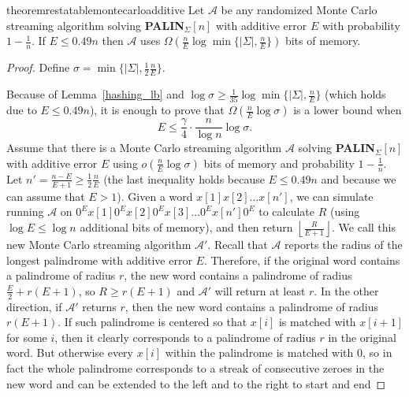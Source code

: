 \documentclass{article}[11pt,letter]
\newcommand{\alg}{\mathcal{A}}
\newcommand{\palin}[1][n]{{\bf PALIN}$_{\Sigma}[#1]$\xspace}
\newcommand{\aerr}{\ensuremath{E}}
\begin{document}
\begin{restatable}{theorem}{restatablemontecarloadditive}
\label{th:montecarlo_additive_lowerbound}
Let $\alg$ be any randomized Monte Carlo streaming algorithm solving \palin with additive error $\aerr$
with probability $1-\frac{1}{n}$. If $\aerr \le 0.49n$ then $\alg$ uses
$\Omega(\frac{n}{\aerr} \log \min \{|\Sigma|,\frac{n}{\aerr}\} )$ bits of memory.
\end{restatable}

\begin{proof}
Define $\sigma = \min \{|\Sigma|,\frac12 \frac{n}{\aerr}\}.$

Because of Lemma~\ref{hashing_lb} and $\log\sigma \geq \frac{1}{35}\log \min\{|\Sigma|,\frac{n}{\aerr}\}$
(which holds due to $\aerr \leq 0.49n$),
it is enough to prove that $\Omega(\frac{n}{\aerr} \log \sigma)$ is a lower bound when 
\begin{equation}\label{foo} \aerr \le \frac{\gamma}4 \cdot \frac{n}{\log n} \log \sigma. \end{equation} 
Assume that there is a Monte Carlo streaming algorithm $\alg$ solving \palin with additive error $\aerr$ using $o(\frac{n}{\aerr}\log \sigma)$ 
bits of memory and probability $1-\frac{1}{n}$. 
Let $n' = \frac{n-\aerr}{\aerr+1} \ge \frac12 \frac{n}{\aerr}$ (the last inequality holds because $\aerr \le 0.49n$ and because we can assume that $\aerr > 1$).  Given a word $x[1] x[2] \ldots x[n']$, we can simulate running $\alg$
on $0^{\aerr} x[1] 0^{\aerr} x[2] 0^{\aerr} x[3] \ldots 0^{\aerr} x[n'] 0^{\aerr}$ to calculate $R$ (using $\log \aerr \leq \log n$ additional bits of memory), and then return $\left\lfloor \frac{R}{\aerr+1}\right\rfloor$.
We call this new Monte Carlo streaming algorithm $\alg'$.
Recall that $\alg$ reports the radius of the longest palindrome with additive error $\aerr$. Therefore, if the original word contains
a palindrome of radius $r$, the new word contains a palindrome of radius $\frac{\aerr}{2}+r(\aerr+1)$, so $R\geq r(\aerr+1)$ and $\alg'$
will return at least $r$. In the other direction, if $\alg'$ returns $r$, then the new word contains a palindrome of radius $r(\aerr+1)$.
If such palindrome is centered so that $x[i]$ is matched with $x[i+1]$ for some $i$, then
it clearly corresponds to a palindrome of radius $r$ in the original word. But otherwise every
$x[i]$ within the palindrome is matched with $0$, so in fact the whole palindrome corresponds to a streak
of consecutive zeroes in the new word and can be extended to the left and to the right to start and end

\end{proof}
\end{document}
